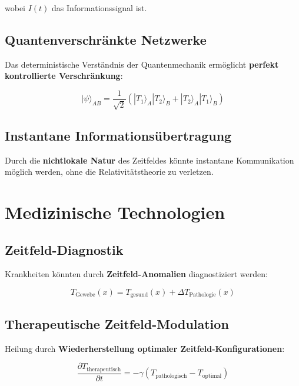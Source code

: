 \documentclass[12pt,a4paper]{report}
\begin{document}
	wobei $I(t)$ das Informationssignal ist.
	
	\subsection{Quantenverschränkte Netzwerke}
	
	Das deterministische Verständnis der Quantenmechanik ermöglicht \textbf{perfekt kontrollierte Verschränkung}:
	
	\begin{equation}
		|\psi\rangle_{AB} = \frac{1}{\sqrt{2}}(|T_1\rangle_A|T_2\rangle_B + |T_2\rangle_A|T_1\rangle_B)
	\end{equation}
	
	\subsection{Instantane Informationsübertragung}
	
	Durch die \textbf{nichtlokale Natur} des Zeitfeldes könnte instantane Kommunikation möglich werden, ohne die Relativitätstheorie zu verletzen.
	
	\section{Medizinische Technologien}
	
	\subsection{Zeitfeld-Diagnostik}
	
	Krankheiten könnten durch \textbf{Zeitfeld-Anomalien} diagnostiziert werden:
	
	\begin{equation}
		T_{\text{Gewebe}}(x) = T_{\text{gesund}}(x) + \Delta T_{\text{Pathologie}}(x)
	\end{equation}
	
	\subsection{Therapeutische Zeitfeld-Modulation}
	
	Heilung durch \textbf{Wiederherstellung optimaler Zeitfeld-Konfigurationen}:
	
	\begin{equation}
		\frac{\partial T_{\text{therapeutisch}}}{\partial t} = -\gamma(T_{\text{pathologisch}} - T_{\text{optimal}})
	\end{equation}
	
\end{document}
